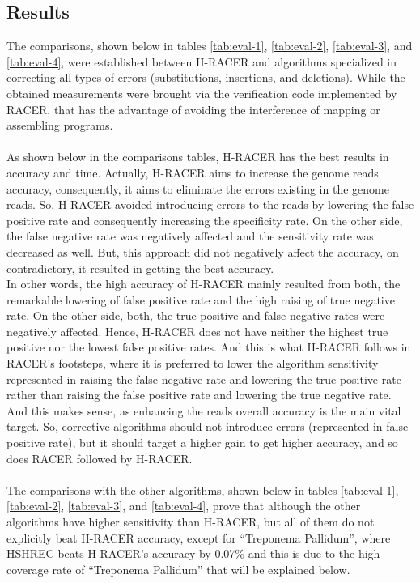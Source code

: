 \documentclass{llncs}
\begin{document}
\subsection{Results}
The comparisons, shown below in tables \ref{tab:eval-1}, \ref{tab:eval-2}, \ref{tab:eval-3}, and \ref{tab:eval-4}, were established between H-RACER and algorithms specialized in correcting all types of errors (substitutions, insertions, and deletions). While the obtained measurements were brought via the verification code implemented by RACER, that has the advantage of avoiding the interference of mapping or assembling programs. 
\\\\
As shown below in the comparisons tables, H-RACER has the best results in accuracy and time. Actually, H-RACER aims to increase the genome reads accuracy, consequently, it aims to eliminate the errors existing in the genome reads. So, H-RACER avoided introducing errors to the reads by lowering the false positive rate and consequently increasing the specificity rate. On the other side, the false negative rate was negatively affected and the sensitivity rate was decreased as well. But, this approach did not negatively affect the accuracy, on contradictory, it resulted in getting the best accuracy.
\\
In other words, the high accuracy of H-RACER mainly resulted from both, the remarkable lowering of false positive rate and the high raising of true negative rate. On the other side, both, the true positive and false negative rates were negatively affected. Hence, H-RACER does not have neither the highest true positive nor the lowest false positive rates. And this is what H-RACER follows in RACER's footsteps, where it is preferred to lower the algorithm sensitivity represented in raising the false negative rate and lowering the true positive rate rather than raising the false positive rate and lowering the true negative rate. And this makes sense, as enhancing the reads overall accuracy is the main vital target. So, corrective algorithms should not introduce errors (represented in false positive rate), but it should target a higher gain to get higher accuracy, and so does RACER followed by H-RACER.
\\\\
The comparisons with the other algorithms, shown below in tables \ref{tab:eval-1}, \ref{tab:eval-2}, \ref{tab:eval-3}, and \ref{tab:eval-4}, prove that although the other algorithms have higher sensitivity than H-RACER, but all of them do not explicitly beat H-RACER accuracy, except for \enquote{Treponema Pallidum}, where HSHREC beats H-RACER's accuracy by 0.07\% and this is due to the high coverage rate of \enquote{Treponema Pallidum} that will be explained below.  
\end{document}
